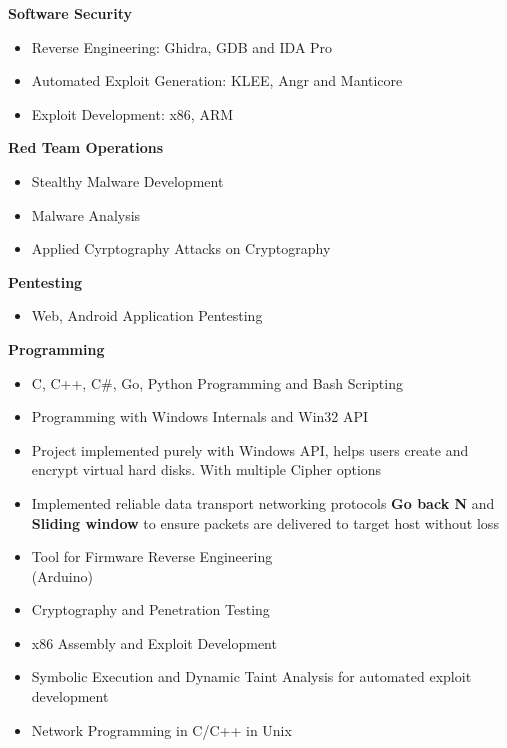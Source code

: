 \smallskip
\textbf{Software Security}
\begin{itemize}
\item Reverse Engineering: Ghidra, GDB and IDA Pro
\item Automated Exploit Generation: KLEE, Angr and Manticore
\item Exploit Development: x86, ARM
\end{itemize}
\textbf{Red Team Operations}
\begin{itemize}
\item Stealthy Malware Development
\item Malware Analysis
\item Applied Cyrptography Attacks on Cryptography 
\end{itemize}
\textbf{Pentesting}
\begin{itemize}
\item Web, Android Application Pentesting
\end{itemize}
\textbf{Programming}
\begin{itemize}
\item C, C++, C\#, Go, Python Programming and Bash Scripting
\item Programming with Windows Internals and Win32 API
\end{itemize}
\smallskip
{}
\begin{itemize}
\item Project implemented purely with Windows API, helps users create and encrypt virtual hard disks. With multiple Cipher options
\end{itemize}
\smallskip
{}
\begin{itemize}
\item Implemented reliable data transport networking protocols \textbf{Go back N} and \textbf{Sliding window} to ensure packets are delivered to target host without loss 
\end{itemize}
\smallskip
{}
\begin{itemize}
\item Tool for Firmware Reverse Engineering \\(Arduino)
\end{itemize}
\smallskip
\smallskip
{}
\begin{itemize}
    \item Cryptography and Penetration Testing
\end{itemize}
\begin{itemize}
    \item x86 Assembly and Exploit Development
\end{itemize}
\begin{itemize}
    \item Symbolic Execution and Dynamic Taint Analysis for automated exploit development
\end{itemize}
\begin{itemize}
    \item Network Programming in C/C++ in Unix
\end{itemize}
